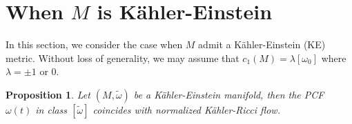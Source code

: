 \documentclass[11pt]{amsart}
\newtheorem{prop}[lem]{Proposition}
\numberwithin{equation}{section}
\begin{document}
\section{When $M$ is K\"ahler-Einstein \\}

In this section, we consider the case when $M$ admit a K\"ahler-Einstein (KE) metric. Without loss of generality,  we may assume that $c_1(M)=\lambda[\omega_0]$ where $\lambda=\pm 1$ or 0. \\



\begin{prop}
	Let $(M,\tilde\omega)$ be a K\"ahler-Einstein manifold, then the PCF $\omega(t)$ in class $[\tilde\omega]$ coincides with normalized K\"ahler-Ricci flow. \\
\end{prop}
\end{document}
